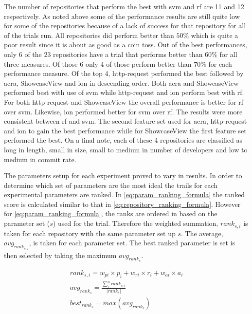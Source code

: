 The number of repositories that perform the best with \gls{svm} and \gls{rf} are 11 and 12 respectively. As noted above some of the performance results are still quite low for some of the repositories because of a lack of success for that repository for all of the trials run. All repositories did perform better than $50\%$ which is quite a poor result since it is about as good as a coin toss. Out of the best performances, only 6 of the 23 repositories have a trial that performs better than $60\%$ for all three measures. Of those 6 only 4 of those perform better than $70\%$ for each performance measure. Of the top 4, http-request performed the best followed by acra, ShowcaseView and ion in descending order. Both acra and ShowcaseView performed best with use of \gls{svm} while http-request and ion perform best with \gls{rf}. For both http-request and ShowcaseView the overall performance is better for \gls{rf} over \gls{svm}. Likewise, ion performed better for \gls{svm} over \gls{rf}. The results were more consistent between \gls{rf} and \gls{svm}. The second feature set used for acra, http-request and ion to gain the best performance while for ShowcaseView the first feature set performed the best. On a final note, each of these 4 repositories are classified as long in length, small in size, small to medium in number of developers and low to medium in commit rate.

The parameters setup for each experiment proved to vary in results. In order to determine which set of parameters are the most ideal the trails for each experimental parameters are ranked. In \autoref{eq:param_ranking_formula} the ranked score is calculated similar to that in \autoref{eq:repository_ranking_formula}. However for \autoref{eq:param_ranking_formula}, the ranks are ordered in based on the parameter set ($s$) used for the trial. Therefore the weighted summation, $rank_{s,i}$ is taken for each repository with the same parameter set up $s$. The average, $avg_{rank_{s,i}}$, is taken for each parameter set. The best ranked parameter is set is then selected by taking the maximum $avg_{rank_{s}}$.

\begin{equation} 
\label{eq:param_ranking_formula}
\begin{matrix}
rank_{s,i} = w_{pi} \times p_i + w_{ri} \times r_i + w_{ai} \times a_i \\
avg_{rank_{s}} = \frac{\sum_{i}^{n}rank_{s,i}}{|rank_{s}|} \\
best_{rank_{s}} = max(avg_{rank_{s}})
\end{matrix}
\end{equation}

